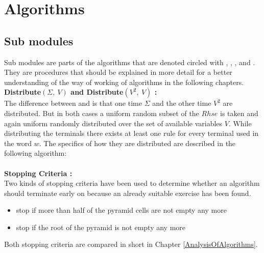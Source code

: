 
\section{Algorithms}\label{algorithms}
\subsection{Sub modules}
Sub modules are parts of the algorithms that are denoted circled with , , ,  and . They are procedures that should be explained in more detail for a better understanding of the way of working of algorithms in the following chapters.\\
\noindent \textbf{Distribute$(\Sigma,\ V) $  and Distribute$(V^2,\ V)$ :}\\
The difference between  and  is that one time $\Sigma$ and the other time $V^2$ are distributed. But in both cases a uniform random subset of the $Rhse$ is taken and again uniform randomly distributed over the set of available variables $V$. While distributing the terminals there exists at least one rule for every terminal used in the word $w$. The specifics of how they are distributed are described in the following algorithm: \\

\noindent
{} \\

\noindent \textbf{Stopping Criteria :}\\
Two kinds of stopping criteria have been used to determine whether an algorithm should terminate early on because an already suitable exercise has been found.
\begin{itemize}[noitemsep,nolistsep]
	\item stop if more than half of the pyramid cells are not empty any more
	\item stop if the root of the pyramid is not empty any more
\end{itemize}
Both stopping criteria are compared in short in Chapter \ref{AnalysisOfAlgorithms}. \\

